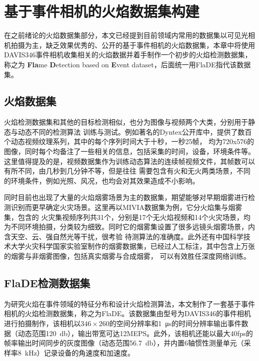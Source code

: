 
\chapter{基于事件相机的火焰数据集构建}
在之前绪论的火焰数据集部分，本文已经提到目前领域内常用的数据集以可见光相机拍摄为主，缺乏效果优秀的、公开的基于事件相机的火焰数据集，本章中将使用DAVIS346事件相机收集相关的火焰数据并着手制作一个初步的火焰检测数据集，称之为 \textbf{Fla}me \textbf{D}etection based on \textbf{E}vent dataset，后面统一用FlaDE指代该数据集。

\section{火焰数据集}
火焰检测数据集和其他的目标检测相似，也分为图像与视频两个大类，分别用于静态与动态不同的检测算法
训练与测试。例如著名的Dyntex公开库\cite{peteri2008comprehensive}中，提供了数百个动态视频纹理系列，其中的每个序列时间大于十秒，一秒25帧，
均为720x576的图像，同时每个均备注了一些相关的信息，包括采集的时间，设备，环境条件等。这里值得提及的是，视频数据集作为训练动态算法的连续帧视频文件，其帧数可以有所不同，由几秒到几分钟不等，但是往往
需要包含有火和无火两类场景，不同的环境条件，例如光照、风况，也均会对其效果造成不小影响。

同时目前也出现了大量的火焰烟雾场景为主的数据集，期望能够对早期烟雾进行检测识别而更早确定火灾场景。这里再以MIVIA数据集\cite{foggia2015real}为例，它分火焰集与烟雾集，包含的
火灾集视频序列共31个，分别是17个无火焰视频和14个火灾场景，均为不同环境拍摄，分类较为细致。同时它的烟雾集设置了很多远镜头烟雾场景，内含天空、云、强自然光等干扰，很考验
待测算法的准确度。此外还有中国科学技术大学火灾科学国家实验室制作的烟雾数据集，已经过人工标注，其中包含上万张的烟雾与非烟雾图像，包括真实烟雾与合成烟雾，
可以有效胜任深度网络训练。

\section{FlaDE检测数据集}
为研究火焰在事件领域的特征分布和设计火焰检测算法，本文制作了一套基于事件相机的火焰检测数据集，称之为FlaDE。该数据集由型号为DAVIS346的事件相机进行拍摄制作，该相机以$346\times260$的空间分辨率和\SI{1}{\micro\second}的时间分辨率输出事件数据（动态范围\SI{120}{\decibel}），输出带宽可达12MEPS。此外，该相机还能以最大40fps的帧率输出时间同步的灰度图像（动态范围\SI{56.7}{\decibel}），并内置6轴惯性测量单元（采样率\SI{8}{\kilo\hertz}）记录设备的角速度和加速度。

